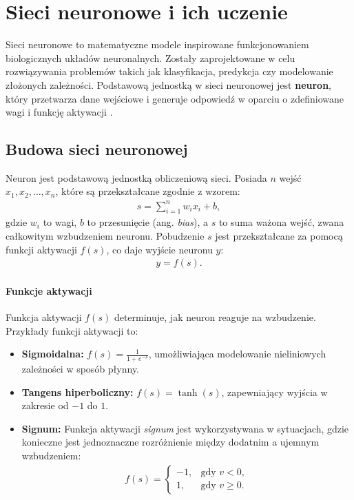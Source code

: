 \documentclass[a4paper,twoside,12pt]{book}
\begin{document}
\section{Sieci neuronowe i ich uczenie}
Sieci neuronowe to matematyczne modele inspirowane funkcjonowaniem biologicznych układów neuronalnych. Zostały zaprojektowane w celu rozwiązywania problemów takich jak klasyfikacja, predykcja czy modelowanie złożonych zależności. Podstawową jednostką w sieci neuronowej jest \textbf{neuron}, który przetwarza dane wejściowe i generuje odpowiedź w oparciu o zdefiniowane wagi i funkcję aktywacji \cite{bib:bielecki}.

\subsection{Budowa sieci neuronowej}
Neuron jest podstawową jednostką obliczeniową sieci. Posiada \(n\) wejść \(x_1, x_2, \ldots, x_n\), które są przekształcane zgodnie z wzorem:
\begin{align}
    s = \sum_{i=1}^n w_i x_i + b,
\end{align}
gdzie \(w_i\) to wagi, \(b\) to przesunięcie (ang. \textit{bias}), a \(s\) to suma ważona wejść, zwana całkowitym wzbudzeniem neuronu. Pobudzenie \(s\) jest przekształcane za pomocą funkcji aktywacji \(f(s)\), co daje wyjście neuronu \(y\):
\begin{align}
    y = f(s).
\end{align}

\paragraph{Funkcje aktywacji}
\cite{bib:fujarewicz} Funkcja aktywacji \(f(s)\) determinuje, jak neuron reaguje na wzbudzenie. Przykłady funkcji aktywacji to:
\begin{itemize}
    \item \textbf{Sigmoidalna:} \(f(s) = \frac{1}{1 + e^{-s}}\), umożliwiająca modelowanie nieliniowych zależności w sposób płynny.
    \item \textbf{Tangens hiperboliczny:} \(f(s) = \tanh(s)\), zapewniający wyjścia w zakresie od \(-1\) do \(1\).
    \item \textbf{Signum:} Funkcja aktywacji \textit{signum} jest wykorzystywana w sytuacjach, gdzie konieczne jest jednoznaczne rozróżnienie między dodatnim a ujemnym wzbudzeniem:
    \begin{align}
        f(s) =
        \begin{cases} 
            -1, & \text{gdy } v < 0, \\
             1, & \text{gdy } v \geq 0.
        \end{cases}
    \end{align}
\end{itemize}
\end{document}
